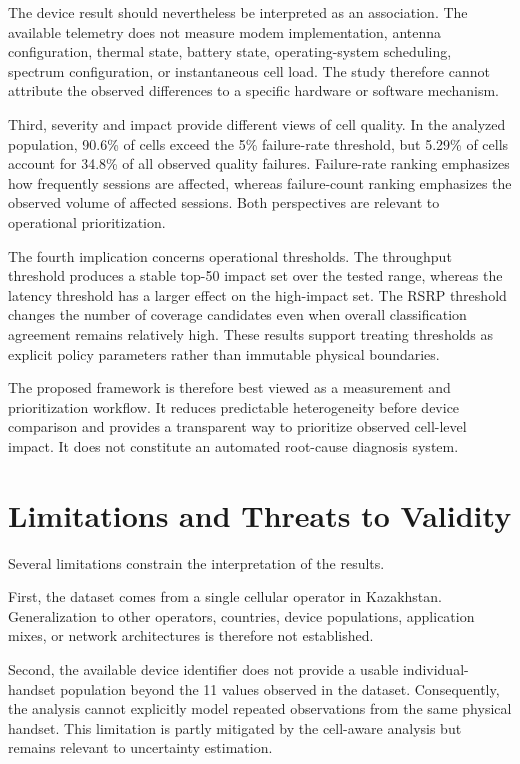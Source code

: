 \documentclass[conference]{IEEEtran}
\begin{document}
The device result should nevertheless be interpreted as an association. The available telemetry does not measure modem implementation, antenna configuration, thermal state, battery state, operating-system scheduling, spectrum configuration, or instantaneous cell load. The study therefore cannot attribute the observed differences to a specific hardware or software mechanism.

Third, severity and impact provide different views of cell quality. In the analyzed population, 90.6\% of cells exceed the 5\% failure-rate threshold, but 5.29\% of cells account for 34.8\% of all observed quality failures. Failure-rate ranking emphasizes how frequently sessions are affected, whereas failure-count ranking emphasizes the observed volume of affected sessions. Both perspectives are relevant to operational prioritization.

The fourth implication concerns operational thresholds. The throughput threshold produces a stable top-50 impact set over the tested range, whereas the latency threshold has a larger effect on the high-impact set. The RSRP threshold changes the number of coverage candidates even when overall classification agreement remains relatively high. These results support treating thresholds as explicit policy parameters rather than immutable physical boundaries.

The proposed framework is therefore best viewed as a measurement and prioritization workflow. It reduces predictable heterogeneity before device comparison and provides a transparent way to prioritize observed cell-level impact. It does not constitute an automated root-cause diagnosis system.

\section{Limitations and Threats to Validity}

Several limitations constrain the interpretation of the results.

First, the dataset comes from a single cellular operator in Kazakhstan. Generalization to other operators, countries, device populations, application mixes, or network architectures is therefore not established.

Second, the available device identifier does not provide a usable individual-handset population beyond the 11 values observed in the dataset. Consequently, the analysis cannot explicitly model repeated observations from the same physical handset. This limitation is partly mitigated by the cell-aware analysis but remains relevant to uncertainty estimation.
\end{document}
